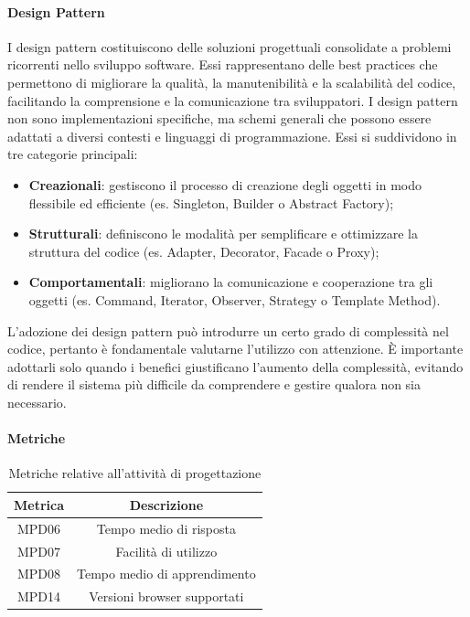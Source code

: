 \documentclass[10pt]{article}
\begin{document}
\begin{justify}
        \paragraph{Design Pattern}
        I design pattern costituiscono delle soluzioni progettuali consolidate a problemi ricorrenti nello sviluppo software. Essi rappresentano delle best practices che permettono di migliorare la qualità, la manutenibilità e la scalabilità del codice, facilitando la comprensione e la comunicazione tra sviluppatori. I design pattern non sono implementazioni specifiche, ma schemi generali che possono essere adattati a diversi contesti e linguaggi di programmazione. Essi si suddividono in tre categorie principali:
        \begin{itemize}
            \item \textbf{Creazionali}: gestiscono il processo di creazione degli oggetti in modo flessibile ed efficiente (es. Singleton, Builder o Abstract Factory);
            \item \textbf{Strutturali}: definiscono le modalità per semplificare e ottimizzare la struttura del codice (es. Adapter, Decorator, Facade o Proxy);
            \item \textbf{Comportamentali}: migliorano la comunicazione e cooperazione tra gli oggetti (es. Command, Iterator, Observer, Strategy o Template Method).
        \end{itemize}
        L'adozione dei design pattern può introdurre un certo grado di complessità nel codice, pertanto è fondamentale valutarne l'utilizzo con attenzione. È importante adottarli solo quando i benefici giustificano l'aumento della complessità, evitando di rendere il sistema più difficile da comprendere e gestire qualora non sia necessario.

        \paragraph{Metriche}
        \begin{table}[H]
          \centering
          \begin{tabular}{|c|c|}
            \hline
            \textbf{Metrica} & \textbf{Descrizione} \\
            \hline
            MPD06 & Tempo medio di risposta\\
            \hline
            MPD07 & Facilità di utilizzo\\
            \hline
            MPD08 & Tempo medio di apprendimento\\
            \hline
            MPD14 & Versioni browser supportati\\
            \hline
          \end{tabular}
          \caption{Metriche relative all'attività di progettazione}
        \end{table}


\end{justify}
\end{document}

